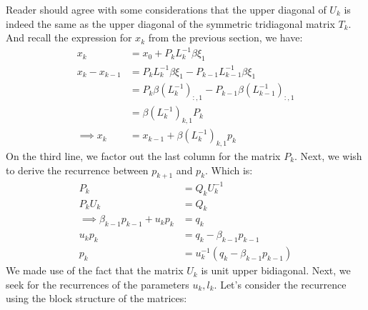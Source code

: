 \documentclass[]{article}
\theoremstyle{definition}
\begin{document}
            Reader should agree with some considerations that the upper diagonal of $U_k$ is indeed the same as the upper diagonal of the symmetric tridiagonal matrix $T_k$. And recall the expression for $x_k$ from the previous section, we have: 
            \begin{align}
                x_k &= x_0 + P_k L_k^{-1}\beta \xi_1 \\ 
                x_{k} - x_{k - 1} &= 
                P_k L_k^{-1} \beta \xi_1 - P_{k - 1}L^{-1}_{k - 1}\beta \xi_1
                \\
                &= P_k \beta(L^{-1}_k)_{:, 1} - P_{k - 1}\beta(L^{-1}_{k - 1})_{:, 1}
                \\
                &= \beta(L^{-1}_k)_{k, 1}P_k
                \\
                \implies x_k &= x_{k - 1} + \beta(L^{-1}_k)_{k, 1}p_k
            \end{align}
            On the third line, we factor out the last column for the matrix $P_k$. Next, we wish to derive the recurrence between $p_{k + 1}$ and $p_k$. Which is: 
            \begin{align}
                P_k &= Q_k U^{-1}_k
                \\
                P_kU_k &= Q_k
                \\\implies
                \beta_{k - 1}p_{k - 1} + u_k p_k &= q_k 
                \\
                u_k p_k &= q_k - \beta_{k - 1}p_{k - 1}
                \\
                p_k &= u^{-1}_k(q_k - \beta_{k - 1}p_{k - 1})
            \end{align}
            We made use of the fact that the matrix $U_k$ is unit upper bidiagonal. Next, we seek for the recurrences of the parameters $u_k, l_k$. Let's consider the recurrence using the block structure of the matrices: 
\end{document}
